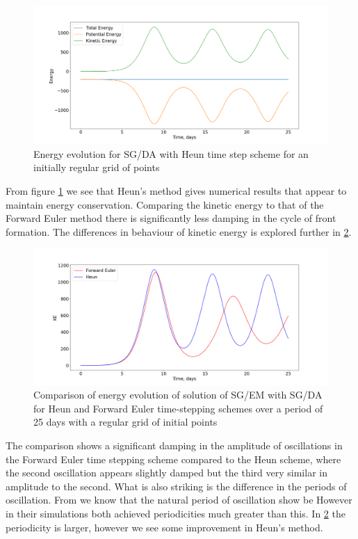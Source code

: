 \begin{figure}[h]
	\centering
	\includegraphics[width=1.0\linewidth]{evaluation/Energy_evolution_heun}
	\caption[Energy evolution for SG/DA with Heun time step scheme]{Energy evolution for SG/DA with Heun time step scheme for an initially regular grid of points}
	\label{fig:energyevolutionheun}
\end{figure}
From figure \ref{fig:energyevolutionheun} we see that Heun's method gives numerical results that appear to maintain energy conservation. Comparing the kinetic energy to that of the Forward Euler method there is significantly less damping in the cycle of front formation. The differences in behaviour of kinetic energy is explored further in \ref{fig:energyeulerheuncomparison}.
\begin{figure}[h]
	\centering
	\includegraphics[width=1.0\linewidth]{evaluation/energy_euler_heun_comparison}
	\caption[Comparison of Energy Evolution for SG/DA with Heun/Forward Euler Time Stepping Schemes]{Comparison of energy evolution of solution of SG/EM with SG/DA for Heun and Forward Euler time-stepping schemes over a period of 25 days with a regular grid of initial points}
	\label{fig:energyeulerheuncomparison}
\end{figure}
The comparison shows a significant damping in the amplitude of oscillations in the Forward Euler time stepping scheme compared to the Heun scheme, where the second oscillation appears slightly damped but the third very similar in amplitude to the second. What is also striking is the difference in the periods of oscillation. From \cite{Cullen2006a} we know that the natural period of oscillation show be  However in their simulations both \cite{Cullen1993,Nakamura1994} achieved periodicities much greater than this. In \ref{fig:energyeulerheuncomparison} the periodicity is larger, however we see some improvement in Heun's method.
